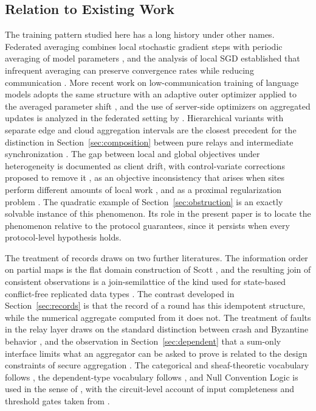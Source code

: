 \documentclass[11pt]{article}
\theoremstyle{definition}
\theoremstyle{remark}
\begin{document}
\subsection{Relation to Existing Work}

The training pattern studied here has a long history under other names. Federated averaging combines local stochastic gradient steps with periodic averaging of model parameters \cite{mcmahan2017}, and the analysis of local SGD established that infrequent averaging can preserve convergence rates while reducing communication \cite{stich2019}. More recent work on low-communication training of language models adopts the same structure with an adaptive outer optimizer applied to the averaged parameter shift \cite{douillard2023}, and the use of server-side optimizers on aggregated updates is analyzed in the federated setting by \cite{reddi2021}. Hierarchical variants with separate edge and cloud aggregation intervals are the closest precedent for the distinction in Section~\ref{sec:composition} between pure relays and intermediate synchronization \cite{liu2020}. The gap between local and global objectives under heterogeneity is documented as client drift, with control-variate corrections proposed to remove it \cite{karimireddy2020}, as an objective inconsistency that arises when sites perform different amounts of local work \cite{wang2020}, and as a proximal regularization problem \cite{li2020}. The quadratic example of Section~\ref{sec:obstruction} is an exactly solvable instance of this phenomenon. Its role in the present paper is to locate the phenomenon relative to the protocol guarantees, since it persists when every protocol-level hypothesis holds.

The treatment of records draws on two further literatures. The information order on partial maps is the flat domain construction of Scott \cite{scott1976}, and the resulting join of consistent observations is a join-semilattice of the kind used for state-based conflict-free replicated data types \cite{shapiro2011}. The contrast developed in Section~\ref{sec:records} is that the record of a round has this idempotent structure, while the numerical aggregate computed from it does not. The treatment of faults in the relay layer draws on the standard distinction between crash and Byzantine behavior \cite{lamport1982,castro1999}, and the observation in Section~\ref{sec:dependent} that a sum-only interface limits what an aggregator can be asked to prove is related to the design constraints of secure aggregation \cite{bonawitz2017}. The categorical and sheaf-theoretic vocabulary follows \cite{maclane1998,maclane1992,awodey2010}, the dependent-type vocabulary follows \cite{martinlof1984,hottbook2013}, and Null Convention Logic is used in the sense of \cite{fant1996,fant2005}, with the circuit-level account of input completeness and threshold gates taken from \cite{kim2020}.
\end{document}
